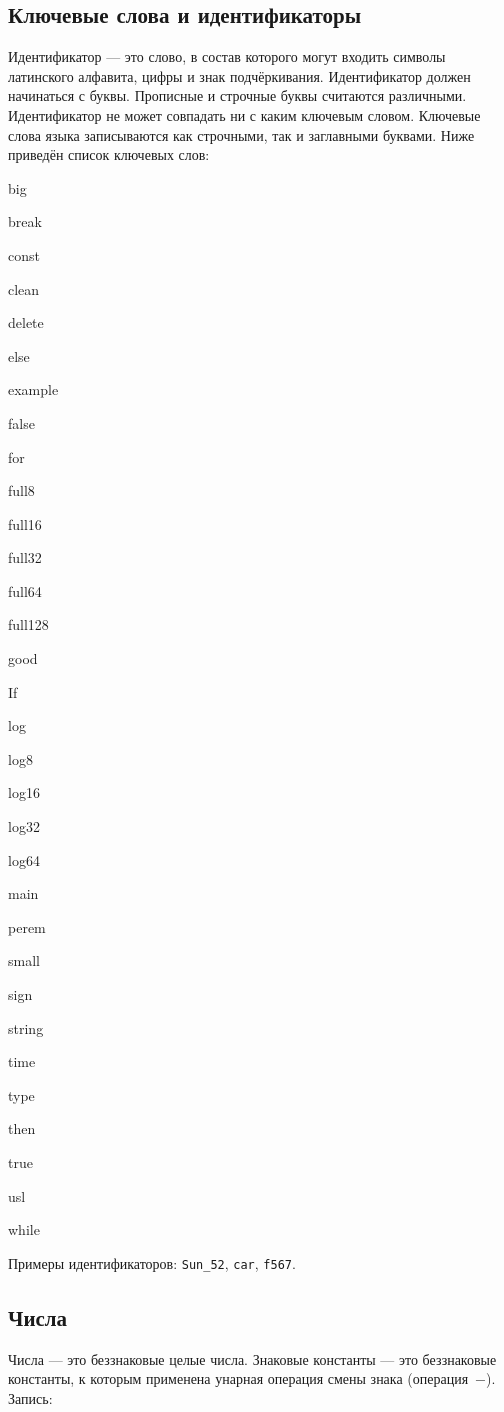 \documentclass[10pt]{report}
\newcounter{rem}[section]
\newcounter{exam}[section]
\begin{document}
        \subsection{Ключевые слова и идентификаторы}
Идентификатор --- это слово, в состав которого могут входить символы латинского алфавита, цифры и знак подчёркивания. Идентификатор должен начинаться с буквы.
Прописные и строчные буквы считаются различными. Идентификатор не может совпадать ни с каким ключевым словом. Ключевые слова языка записываются как строчными, так и заглавными буквами. Ниже приведён список ключевых слов:        
\begin{multicols}{3}
\bf


big

break

const

clean

delete

else

example

false

for

full8

full16

full32

full64

full128

good

If

log

log8

log16

log32

log64

main

perem

small

sign

string

time

type

then

true

usl

while


\end{multicols}

Примеры идентификаторов: \texttt{Sun_52}, \texttt{car}, \texttt{f567}.   

    
        \subsection{Числа}
Числа --- это беззнаковые целые числа. Знаковые константы --- это беззнаковые константы, к которым применена унарная операция смены знака (операция\ \glqq$-$\grqq). Запись:
\end{document}
